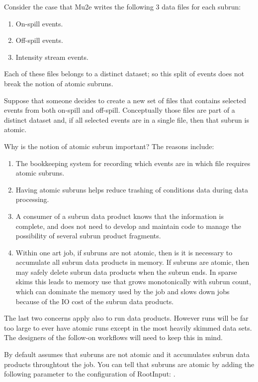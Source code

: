 Consider the case that Mu2e writes the following 3 data files for each subrun:
\begin{enumerate}
\item On-spill events.
\item Off-spill events.
\item Intensity stream events.
\end{enumerate}
Each of these files belongs to a distinct dataset; so this split of events does not break the notion
of atomic subruns.

Suppose that someone decides to create a new set of files that contains selected events from both on-spill
and off-spill.  Conceptually those files are part of a distinct dataset and, if all selected events
are in a single file, then that subrun is atomic.

Why is the notion of atomic subrun important?  The reasons include:
\begin{enumerate}
\item The bookkeeping system for recording which events are in which file requires atomic subruns.
\item Having atomic subruns helps reduce trashing of conditions data during data processing.
\item A consumer of a subrun data product knows that the information is complete, and does not need
  to develop and maintain code to manage the possibility of several subrun product fragments.
\item Within one art job, if subruns are not atomic,
  then is it is necessary to accumulate all subrun data products in memory.
  If subruns are atomic, then \art may safely delete subrun data products when the subrun ends.
  In sparse skims this leads to memory use that grows monotonically with subrun count,
  which can dominate the memory used by the job and slows down jobs because of the IO cost of
  the subrun data products.
\end{enumerate}

The last two concerns apply also to run data products.
However runs will be far too large to ever have atomic runs except in the most heavily skimmed data sets.
The designers of the follow-on workflows will need to keep this in mind.

By default \art assumes that subruns are not atomic and it accumulates subrun data products throughtout the job.
You can tell \art that subruns are atomic by adding the following parameter to the configuration of
RootInput: .

